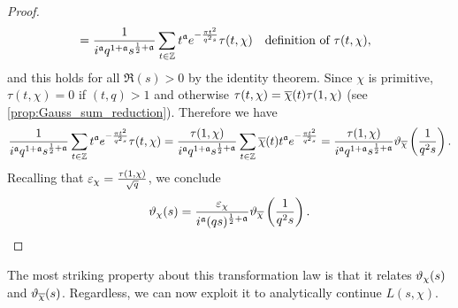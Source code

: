 \begin{proof}
\begin{align*}
          &= \frac{1}{i^{\mathfrak{a}}q^{1+\mathfrak{a}}s^{\frac{1}{2}+\mathfrak{a}}}\sum_{t \in \mathbb{Z}}t^{\mathfrak{a}}e^{-\frac{\pi t^{2}}{q^{2}s}}\tau(t,\chi) && \text{definition of $\tau(t,\chi)$},
        \end{align*}
        and this holds for all $\Re(s) > 0$ by the identity theorem. Since $\chi$ is primitive, $\tau(t,\chi) = 0$ if $(t,q) > 1$ and otherwise $\tau(t,\chi) = \overline{\chi}(t)\tau(1,\chi)$ (see \cref{prop:Gauss_sum_reduction}). Therefore we have
        \[
          \frac{1}{i^{\mathfrak{a}}q^{1+\mathfrak{a}}s^{\frac{1}{2}+\mathfrak{a}}}\sum_{t \in \mathbb{Z}}t^{\mathfrak{a}}e^{-\frac{\pi t^{2}}{q^{2}s}}\tau(t,\chi) = \frac{\tau(1,\chi)}{i^{\mathfrak{a}}q^{1+\mathfrak{a}}s^{\frac{1}{2}+\mathfrak{a}}}\sum_{t \in \mathbb{Z}}\overline{\chi}(t)t^{\mathfrak{a}}e^{-\frac{\pi t^{2}}{q^{2}s}} = \frac{\tau(1,\chi)}{i^{\mathfrak{a}}q^{1+\mathfrak{a}}s^{\frac{1}{2}+\mathfrak{a}}}\vartheta_{\overline{\chi}}\left(\frac{1}{q^{2}s}\right).
        \]
        Recalling that $\varepsilon_{\chi} = \frac{\tau(1,\chi)}{\sqrt{q}}$, we conclude
        \[
          \vartheta_{\chi}(s) = \frac{\varepsilon_{\chi}}{i^{\mathfrak{a}}(qs)^{\frac{1}{2}+\mathfrak{a}}}\vartheta_{\overline{\chi}}\left(\frac{1}{q^{2}s}\right).
        \]
      \end{proof}
      The most striking property about this transformation law is that it relates $\vartheta_{\chi}(s)$ and $\vartheta_{\overline{\chi}}(s)$. Regardless, we can now exploit it to analytically continue $L(s,\chi)$.
